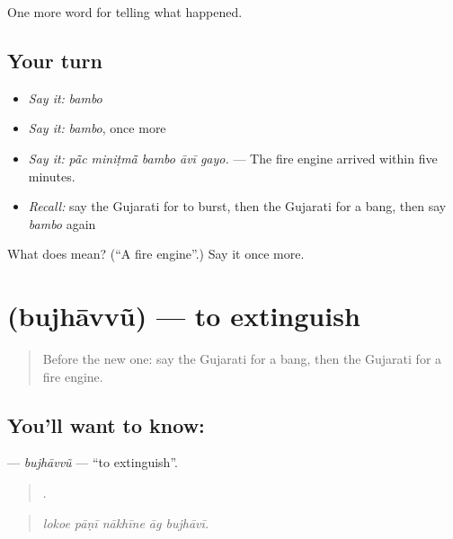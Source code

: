 \begin{grammarlens}[title={What you've built}]
One more word for telling what happened.
\end{grammarlens}

\subsection*{Your turn}
\begin{itemize}
\raggedright
  \item \emph{Say it:} \emph{bambo}
  \item \emph{Say it:} \emph{bambo}, once more
  \item \emph{Say it:} \emph{pā̃c miniṭmā̃ bambo āvī gayo.} — The fire engine arrived within five minutes.
  \item \emph{Recall:} say the Gujarati for to burst, then the Gujarati for a bang, then say \emph{bambo} again
\end{itemize}

\begin{tcolorbox}[breakable,colback=teal!4,colframe=teal!35!black,title={Before you move on}]
What does  mean? (\textquotedblleft{}A fire engine\textquotedblright{}.) Say it once more.
\end{tcolorbox}
\section[\texorpdfstring{\gu{બુઝાવવું} (bujhāvvũ)}{બુઝાવવું (bujhāvvũ)}]{ (bujhāvvũ) — to extinguish}

\label{lesson:GU-C302-bujhavvu}



\begin{quote}
Before the new one: say the Gujarati for a bang, then the Gujarati for a fire engine.
\end{quote}

\subsection*{You'll want to know: }
\textbf{} — \emph{bujhāvvũ} — \textquotedblleft{}to extinguish\textquotedblright{}.

\begin{quote}
    .
\end{quote}

\begin{quote}
\emph{lokoe pāṇī nākhīne āg bujhāvī.}
\end{quote}

